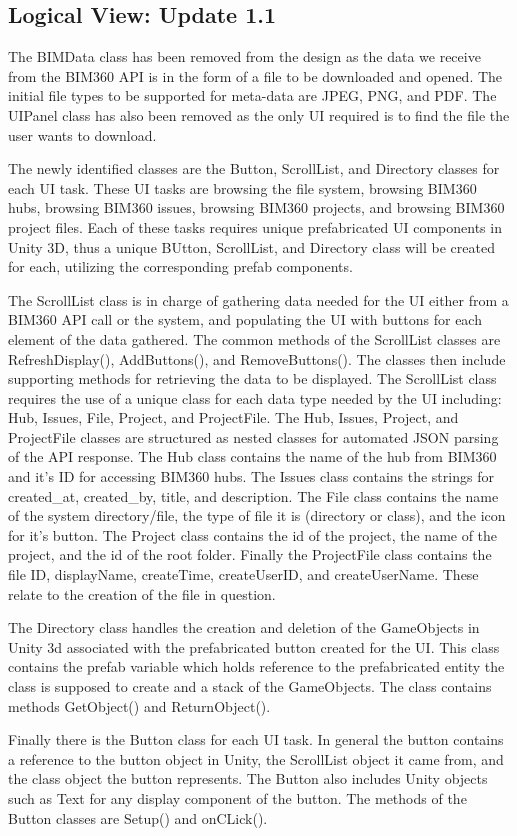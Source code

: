 \documentclass[onecolumn, draftclsnofoot,10pt, compsoc]{IEEEtran}
\begin{document}
\subsection{Logical View: Update 1.1}
The BIMData class has been removed from the design as the data we receive from the BIM360 API is in the form of a file to be downloaded and opened.
The initial file types to be supported for meta-data are JPEG, PNG, and PDF.
The UIPanel class has also been removed as the only UI required is to find the file the user wants to download.\par
The newly identified classes are the Button, ScrollList, and Directory classes for each UI task.
These UI tasks are browsing the file system, browsing BIM360 hubs, browsing BIM360 issues, browsing BIM360 projects, and browsing BIM360 project files.
Each of these tasks requires unique prefabricated UI components in Unity 3D, thus a unique BUtton, ScrollList, and Directory class will be created for each, utilizing the corresponding prefab components.\par
The ScrollList class is in charge of gathering data needed for the UI either from a BIM360 API call or the system, and populating the UI with buttons for each element of the data gathered.
The common methods of the ScrollList classes are RefreshDisplay(), AddButtons(), and RemoveButtons().
The classes then include supporting methods for retrieving the data to be displayed.
The ScrollList class requires the use of a unique class for each data type needed by the UI including: Hub, Issues, File, Project, and ProjectFile.
The Hub, Issues, Project, and ProjectFile classes are structured as nested classes for automated JSON parsing of the API response.
The Hub class contains the name of the hub from BIM360 and it's ID for accessing BIM360 hubs.
The Issues class contains the strings for created\_at, created\_by, title, and description.
The File class contains the name of the system directory/file, the type of file it is (directory or class), and the icon for it's button.
The Project class contains the id of the project, the name of the project, and the id of the root folder.
Finally the ProjectFile class contains the file ID, displayName, createTime, createUserID, and createUserName.
These relate to the creation of the file in question.\par
The Directory class handles the creation and deletion of the GameObjects in Unity 3d associated with the prefabricated button created for the UI.
This class contains the prefab variable which holds reference to the prefabricated entity the class is supposed to create and a stack of the GameObjects.
The class contains methods GetObject() and ReturnObject().\par
Finally there is the Button class for each UI task.
In general the button contains a reference to the button object in Unity, the ScrollList object it came from, and the class object the button represents.
The Button also includes Unity objects such as Text for any display component of the button.
The methods of the Button classes are Setup() and onCLick().\par
\end{document}
